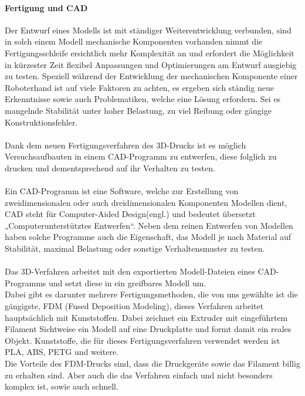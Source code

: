 \documentclass[titlepage,12pt,twoside]{article}
\begin{document}
\paragraph{Fertigung und CAD}
\label{par:Fertigung und CAD}
\hfill \break
\hfill \break
Der Entwurf eines Modells ist mit ständiger Weiterentwicklung verbunden, sind in 
solch einem Modell mechanische Komponenten vorhanden nimmt die Fertigungsschleife 
ersichtlich mehr Komplexität an und erfordert die Möglichkeit in kürzester Zeit 
flexibel Anpassungen und Optimierungen am Entwurf ausgiebig zu testen. Speziell 
während der Entwicklung der mechanischen Komponente einer Roboterhand ist auf 
viele Faktoren zu achten, es ergeben sich ständig neue Erkenntnisse sowie auch 
Problematiken, welche eine Lösung erfordern. Sei es mangelnde Stabilität unter 
hoher Belastung, zu viel Reibung oder gängige Konstruktionsfehler. \\
\\
Dank dem neuen Fertigungsverfahren des 3D-Drucks ist es möglich Versuchsaufbauten 
in einem CAD-Programm zu entwerfen, diese folglich zu drucken und dementsprechend 
auf ihr Verhalten zu testen. \\
\\
Ein CAD-Programm ist eine Software, welche zur Erstellung von zweidimensionalen 
oder auch dreidimensionalen Komponenten Modellen dient, CAD steht für Computer-Aided 
Design(engl.) und bedeutet übersetzt „Computerunterstütztes Entwerfen“. Neben 
dem reinen Entwerfen von Modellen haben solche Programme auch die Eigenschaft, 
das Modell je nach Material auf Stabilität, maximal Belastung oder sonstige 
Verhaltensmuster zu testen. \\
\\
Das 3D-Verfahren arbeitet mit den exportierten Modell-Dateien eines CAD-Programms 
und setzt diese in ein greifbares Modell um. \\
Dabei gibt es darunter mehrere Fertigungsmethoden, die von uns gewählte ist die 
gängigste, FDM (Fused Deposition Modeling), dieses Verfahren arbeitet hauptsächlich 
mit Kunststoffen. Dabei zeichnet ein Extruder mit eingeführtem Filament Sichtweise 
ein Modell auf eine Druckplatte und formt damit ein reales Objekt. Kunststoffe, 
die für dieses Fertigungsverfahren verwendet werden ist PLA, ABS, PETG und weitere. \\
Die Vorteile des FDM-Drucks sind, dass die Druckgeräte sowie das Filament billig 
zu erhalten sind. Aber auch die das Verfahren einfach und nicht besonders komplex 
ist, sowie auch schnell. \\
\end{document}
